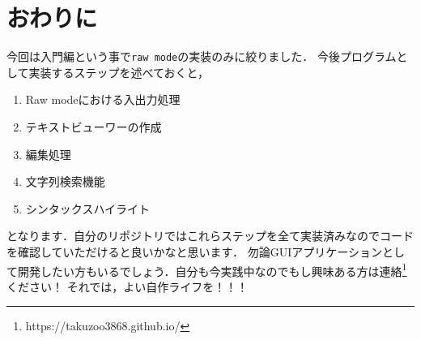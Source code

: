 \section{おわりに}
今回は入門編という事で\texttt{raw mode}の実装のみに絞りました．
今後プログラムとして実装するステップを述べておくと，
\begin{enumerate}
\item Raw modeにおける入出力処理
\item テキストビューワーの作成
\item 編集処理
\item 文字列検索機能
\item シンタックスハイライト
\end{enumerate}
となります．自分のリポジトリではこれらステップを全て実装済みなのでコードを確認していただけると良いかなと思います．
勿論GUIアプリケーションとして開発したい方もいるでしょう．自分も今実践中なのでもし興味ある方は連絡\footnote{https://takuzoo3868.github.io/}ください！
それでは，よい自作ライフを！！！